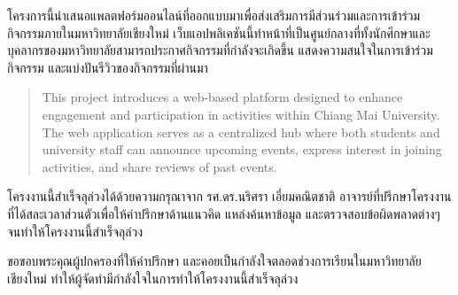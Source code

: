\maketitle
\makesignature

\ifproject
\begin{abstractTH}

โครงการนี้นำเสนอแพลตฟอร์มออนไลน์ที่ออกแบบมาเพื่อส่งเสริมการมีส่วนร่วมและการเข้าร่วมกิจกรรมภายในมหาวิทยาลัยเชียงใหม่ 
เว็บแอปพลิเคชันนี้ทำหน้าที่เป็นศูนย์กลางที่ทั้งนักศึกษาและบุคลากรของมหาวิทยาลัยสามารถประกาศกิจกรรมที่กำลังจะเกิดขึ้น 
แสดงความสนใจในการเข้าร่วมกิจกรรม และแบ่งปันรีวิวของกิจกรรมที่ผ่านมา

\end{abstractTH}

\begin{abstract}

This project introduces a web-based platform designed to enhance engagement and participation in activities within Chiang Mai University.
The web application serves as a centralized hub where both students and university staff can announce upcoming events, express interest in joining activities, and share reviews of past events.
\end{abstract}

\iffalse
\begin{dedication}
This document is dedicated to all Chiang Mai University students.

Dedication page is optional.
\end{dedication}
\fi %

\begin{acknowledgments}
\hspace{\parindent} โครงงานนี้สำเร็จลุล่วงได้ด้วยความกรุณาจาก รศ.ดร.นริศรา เอี่ยมคณิตชาติ อาจารย์ที่ปรึกษาโครงงาน
ที่ได้สละเวลาส่วนตัวเพื่อให้คำปรึกษาด้านแนวคิด แหล่งค้นหาข้อมูล และตรวจสอบข้อผิดพลาดต่างๆ จนทำให้โครงงานนี้สำเร็จลุล่วง\par
ขอขอบพระคุณผู้ปกครองที่ให้คำปรึกษา และคอยเป็นกำลังใจตลอดช่วงการเรียนในมหาวิทยาลัยเชียงใหม่ ทำให้ผู้จัดทำมีกำลังใจในการทำให้โครงงานนี้สำเร็จลุล่วง
\end{acknowledgments}%
\fi %

\contentspage

\ifproject
\figurelistpage

\tablelistpage
\fi %



